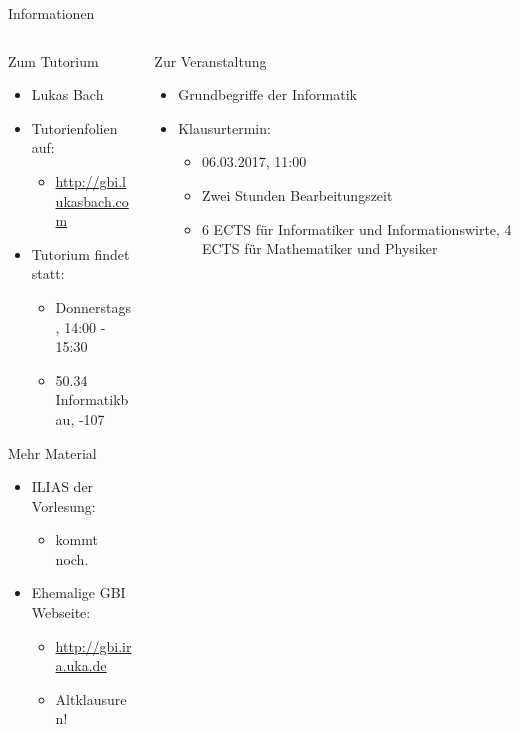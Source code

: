 
{

\begin{frame}{Informationen}
	
	\begin{columns}
		\begin{column}{0.5\textwidth}
			
			\begin{block}{Zum Tutorium}
				\begin{itemize}
					\item Lukas Bach
					\item Tutorienfolien auf: 
					\begin{itemize}
						\item \url{http://gbi.lukasbach.com}
					\end{itemize}
					\item Tutorium findet statt:
					\begin{itemize}
						\item Donnerstags, 14:00 - 15:30
						\item 50.34 Informatikbau, -107
					\end{itemize}
				\end{itemize}
			\end{block}
			
			\begin{block}{Mehr Material}
				\begin{itemize}
					\item ILIAS der Vorlesung:
					\begin{itemize}
						\item kommt noch. %
					\end{itemize}
					\item Ehemalige GBI Webseite:
					\begin{itemize}
						\item \url{http://gbi.ira.uka.de}
						\item Altklausuren!
					\end{itemize}
				\end{itemize}
			\end{block}
			
		\end{column}
		\begin{column}{0.5\textwidth}
			
			\begin{block}{Zur Veranstaltung}
				\begin{itemize}
					\item Grundbegriffe der Informatik
					\item Klausurtermin:
					\begin{itemize}
						\item 06.03.2017, 11:00
						\item Zwei Stunden Bearbeitungszeit
						\item 6 ECTS für Informatiker und Informationswirte, 4 ECTS für Mathematiker und Physiker
					\end{itemize}
				\end{itemize}
			\end{block}
			

\end{column}
\end{columns}
\end{frame}}
